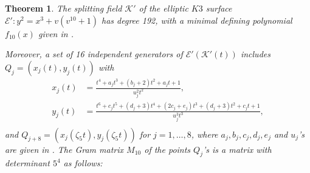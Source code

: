 \documentclass[11pt]{amsart}
\newcommand{\Q}{{\mathbb Q}}
\newcommand{\Ee}{{\mathcal E}}
\newcommand{\KK}{{\mathcal K}}
\newtheorem{thm}{Theorem}[section]
\numberwithin{equation}{section}
\numberwithin{table}{section}
\newcommand\<{\langle}
\begin{document}
\begin{thm}
	\label{main1}
	The splitting field $\KK'$ of the elliptic $K3$ surface  $\Ee': y^2=x^3+   v (v^{10}+1)$ has degree 192,  with  a minimal  defining polynomial $f_{10}(x)$ given in \cite[min-pols]{k3-codes}. 
	
	Moreover,  a set of 16 independent generators of $\Ee'(\KK'(t)) $ includes $Q_j=\left( x_j(t), y_j(t)\right) $ with
	$$\begin{aligned}
		x_j(t) &= \frac{t^4 + a_j t^3 + (b_j +2) t^2 + a_j t +1}{u_j^2  t^2}, \\
		y_j(t) &=\frac{t^6 +c_j t^5+ (d_j +3) t^4 +(2 c_j +e_j) t^3 +(d_j +3) t^2 + c_j t +1}{u_j^3 t^3},\\
	\end{aligned}
	$$
	and $Q_{j+8}=\left( x_{j}(\zeta_5 t), y_{j}( \zeta_5 t)\right) $  	for $j=1, \ldots, 8$,
	where   $a_j, b_j, c_j, d_j, e_j$  and  $u_j$'s are given in 
	 \cite[Points-10]{Shioda360-Codes}.
	 The Gram matrix $M_{10}$ of the  points $Q_j$'s is a matrix with determinant   $5^4$ as follows:
	 

\end{thm}
\end{document}
